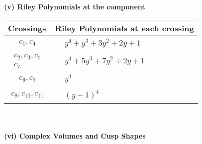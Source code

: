\documentclass[1p]{elsarticle_modified}
\theoremstyle{definition}
\begin{document}
\newpage\renewcommand{\arraystretch}{1}
\flushleft \textbf{(v) Riley Polynomials at the component}\newline \\
\begin{tabular}{m{50pt}|m{274pt}}
Crossings & \hspace{64pt}Riley Polynomials at each crossing \\
\hline $$\begin{aligned}c_{1},c_{4}\end{aligned}$$&$\begin{aligned}
&y^4+y^3+3 y^2+2 y+1
\end{aligned}$\\
\hline $$\begin{aligned}c_{2},c_{3},c_{5}\\c_{7}\end{aligned}$$&$\begin{aligned}
&y^4+5 y^3+7 y^2+2 y+1
\end{aligned}$\\
\hline $$\begin{aligned}c_{6},c_{9}\end{aligned}$$&$\begin{aligned}
&y^4
\end{aligned}$\\
\hline $$\begin{aligned}c_{8},c_{10},c_{11}\end{aligned}$$&$\begin{aligned}
&(y-1)^4
\end{aligned}$\\
\hline
\end{tabular}\\~\\
\newpage\flushleft \textbf{(vi) Complex Volumes and Cusp Shapes}
\end{document}
